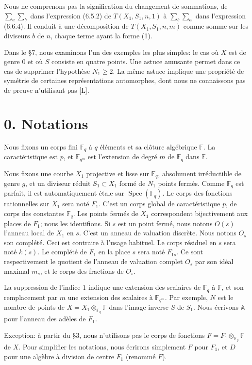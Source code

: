 \documentclass[10pt]{article}
\newcommand{\Fq}{\mathbb F_q}
\newcommand{\Fqm}{\mathbb F_{q^m}}
\newcommand{\Fb}{\mathbb F}
\newcommand{\Adele}{\mathbb A}
\newcommand{\Spec}{\operatorname{Spec}}
\theoremstyle{deligne}
\newcommand{\heading}[1]{\vspace{0.7em}\noindent{\bfseries #1}\quad}
\begin{document}
Nous ne comprenons pas la signification du changement de sommations, de $\sum_a\sum_b$ dans l'expression (6.5.2) de $T(X_1,S_1,n,1)$ à $\sum_b\sum_a$ dans l'expression (6.6.4). Il conduit à une décomposition de $T(X_1,S_1,n,m)$ comme somme sur les diviseurs $b$ de $n$, chaque terme ayant la forme (1).

Dans le \S7, nous examinons l'un des exemples les plus simples: le cas où $X$ est de genre $0$ et où $S$ consiste en quatre points. Une astuce amusante permet dans ce cas de supprimer l'hypothèse $N_1\ge2$. La même astuce implique une propriété de symétrie de certaines représentations automorphes, dont nous ne connaissons pas de preuve n'utilisant pas [L].

\section*{0. Notations}

\heading{0.1.} Nous fixons un corps fini $\Fq$ à $q$ éléments et sa clôture algébrique $\Fb$. La caractéristique est $p$, et $\Fqm$ est l'extension de degré $m$ de $\Fq$ dans $\Fb$.

\heading{0.2.} Nous fixons une courbe $X_1$ projective et lisse sur $\Fq$, absolument irréductible de genre $g$, et un diviseur réduit $S_1\subset X_1$ formé de $N_1$ points fermés. Comme $\Fq$ est parfait, il est automatiquement \'{e}tale sur $\Spec(\Fq)$. Le corps des fonctions rationnelles sur $X_1$ sera noté $F_1$. C'est un corps global de caractéristique $p$, de corps des constantes $\Fq$. Les points fermés de $X_1$ correspondent bijectivement aux places de $F_1$; nous les identifions. Si $s$ est un point fermé, nous notons $O(s)$ l'anneau local de $X_1$ en $s$. C'est un anneau de valuation discrète. Nous notons $O_s$ son complété. Ceci est contraire à l'usage habituel. Le corps résiduel en $s$ sera noté $k(s)$. Le complété de $F_1$ en la place $s$ sera noté $F_{1s}$. Ce sont respectivement le quotient de l'anneau de valuation complet $O_s$ par son idéal maximal $m_s$, et le corps des fractions de $O_s$.

\heading{0.3.} La suppression de l'indice $1$ indique une extension des scalaires de $\Fq$ à $\Fb$, et son remplacement par $m$ une extension des scalaires à $\Fqm$. Par exemple, $N$ est le nombre de points de $X=X_1\otimes_{\Fq}\Fb$ dans l'image inverse $S$ de $S_1$. Nous écrivons $\Adele$ pour l'anneau des adèles de $F_1$.

Exception: à partir du \S3, nous n'utilisons pas le corps de fonctions $F=F_1\otimes_{\Fq}\Fb$ de $X$. Pour simplifier les notations, nous écrirons simplement $F$ pour $F_1$, et $D$ pour une algèbre à division de centre $F_1$ (renommé $F$).
\end{document}
